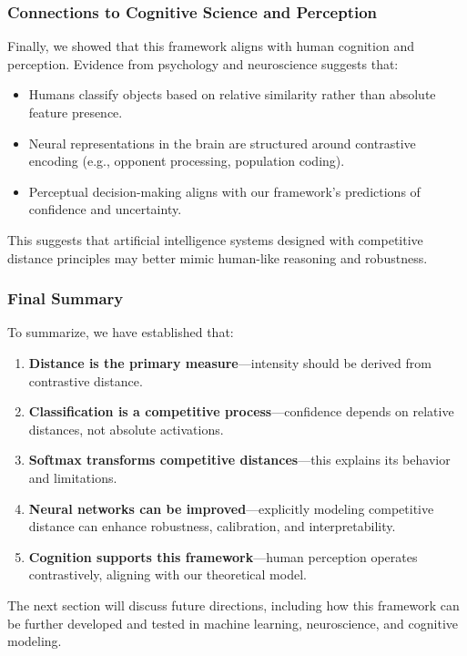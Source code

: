 \subsubsection{Connections to Cognitive Science and Perception}

Finally, we showed that this framework aligns with human cognition and perception. Evidence from psychology and neuroscience suggests that:

\begin{itemize}
    \item Humans classify objects based on relative similarity rather than absolute feature presence.
    \item Neural representations in the brain are structured around contrastive encoding (e.g., opponent processing, population coding).
    \item Perceptual decision-making aligns with our framework’s predictions of confidence and uncertainty.
\end{itemize}

This suggests that artificial intelligence systems designed with competitive distance principles may better mimic human-like reasoning and robustness.

\subsubsection{Final Summary}

To summarize, we have established that:

\begin{enumerate}
    \item \textbf{Distance is the primary measure}—intensity should be derived from contrastive distance.
    \item \textbf{Classification is a competitive process}—confidence depends on relative distances, not absolute activations.
    \item \textbf{Softmax transforms competitive distances}—this explains its behavior and limitations.
    \item \textbf{Neural networks can be improved}—explicitly modeling competitive distance can enhance robustness, calibration, and interpretability.
    \item \textbf{Cognition supports this framework}—human perception operates contrastively, aligning with our theoretical model.
\end{enumerate}

The next section will discuss future directions, including how this framework can be further developed and tested in machine learning, neuroscience, and cognitive modeling.
